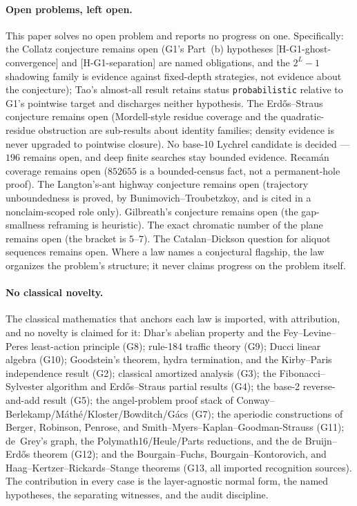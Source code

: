 \documentclass[11pt]{article}
\theoremstyle{definition}
\begin{document}
\paragraph{Open problems, left open.} This paper solves no open problem and reports no progress on
one. Specifically: the Collatz conjecture remains open (G1's Part~(b) hypotheses
[H-G1-ghost-convergence] and [H-G1-separation] are named obligations, and the $2^L - 1$ shadowing
family is evidence against fixed-depth strategies, not evidence about the conjecture); Tao's
almost-all result retains status \texttt{probabilistic} relative to G1's pointwise target and
discharges neither hypothesis. The Erd\H{o}s--Straus conjecture remains open (Mordell-style residue
coverage and the quadratic-residue obstruction are sub-results about identity families; density
evidence is never upgraded to pointwise closure). No base-10 Lychrel candidate is decided ---
$196$ remains open, and deep finite searches stay bounded evidence. Recam\'an coverage remains open
($852655$ is a bounded-census fact, not a permanent-hole proof). The Langton's-ant highway
conjecture remains open (trajectory unboundedness is proved, by Bunimovich--Troubetzkoy, and is
cited in a nonclaim-scoped role only). Gilbreath's conjecture remains open (the gap-smallness
reframing is heuristic). The exact chromatic number of the plane remains open (the bracket is
$5$--$7$). The Catalan--Dickson question for aliquot sequences remains open. Where a law names a
conjectural flagship, the law organizes the problem's structure; it never claims progress on the
problem itself.

\paragraph{No classical novelty.} The classical mathematics that anchors each law is imported, with
attribution, and no novelty is claimed for it: Dhar's abelian property and the Fey--Levine--Peres
least-action principle (G8); rule-184 traffic theory (G9); Ducci linear algebra (G10); Goodstein's
theorem, hydra termination, and the Kirby--Paris independence result (G2); classical amortized
analysis (G3); the Fibonacci--Sylvester algorithm and Erd\H{o}s--Straus partial results (G4); the
base-2 reverse-and-add result (G5); the angel-problem proof stack of
Conway--Berlekamp/M\'ath\'e/Kloster/Bowditch/G\'acs (G7); the aperiodic constructions of Berger,
Robinson, Penrose, and Smith--Myers--Kaplan--Goodman-Strauss (G11); de~Grey's graph, the
Polymath16/Heule/Parts reductions, and the de Bruijn--Erd\H{o}s theorem (G12); and the
Bourgain--Fuchs, Bourgain--Kontorovich, and Haag--Kertzer--Rickards--Stange theorems (G13, all
imported recognition sources). The contribution in every case is the layer-agnostic normal form, the
named hypotheses, the separating witnesses, and the audit discipline.
\end{document}

